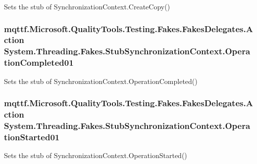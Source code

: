 Sets the stub of Synchronization\-Context.\-Create\-Copy()

\hypertarget{class_system_1_1_threading_1_1_fakes_1_1_stub_synchronization_context_aa7cd021d4963e4c33ccf2df6539a042c}{
\subsubsection[{Operation\-Completed01}]{\setlength{\rightskip}{0pt plus 5cm}mqttf.\-Microsoft.\-Quality\-Tools.\-Testing.\-Fakes.\-Fakes\-Delegates.\-Action System.\-Threading.\-Fakes.\-Stub\-Synchronization\-Context.\-Operation\-Completed01}}\label{class_system_1_1_threading_1_1_fakes_1_1_stub_synchronization_context_aa7cd021d4963e4c33ccf2df6539a042c}


Sets the stub of Synchronization\-Context.\-Operation\-Completed()

\hypertarget{class_system_1_1_threading_1_1_fakes_1_1_stub_synchronization_context_af4673be9174afd1404066f518b00e20c}{
\subsubsection[{Operation\-Started01}]{\setlength{\rightskip}{0pt plus 5cm}mqttf.\-Microsoft.\-Quality\-Tools.\-Testing.\-Fakes.\-Fakes\-Delegates.\-Action System.\-Threading.\-Fakes.\-Stub\-Synchronization\-Context.\-Operation\-Started01}}\label{class_system_1_1_threading_1_1_fakes_1_1_stub_synchronization_context_af4673be9174afd1404066f518b00e20c}


Sets the stub of Synchronization\-Context.\-Operation\-Started()

